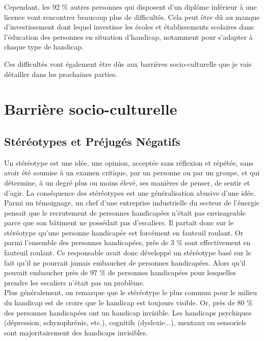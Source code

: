 Cependant, les 92 \% autres personnes qui disposent d'un diplôme inférieur à une licence vont rencontrer beaucoup plus de difficultés. Cela peut être dû au manque d'investissement dont lequel investisse les écoles et établissements scolaires dans l'éducation des personnes en situation d'handicap, notamment pour s'adapter à chaque type de handicap.

Ces difficultés vont également être dûs aux barrières socio-culturelle que je vais détailler dans les prochaines parties.


\section{Barrière socio-culturelle}

\subsection{Stéréotypes et Préjugés Négatifs}
Un stéréotype est une idée, une opinion, acceptée sans réflexion et répétée, sans avoir été soumise à un examen critique, par un personne ou par un groupe, et qui détermine, à un degré plus ou moins élevé, ses manières de penser, de sentir et d'agir.
La conséquence des stéréotypes est une généralisation abusive d'une idée. 
Parmi un témoignage, un chef d'une entreprise industrielle du secteur de l'énergie pensait que le recrutement de personnes handicapées n'était pas envisageable parce que son bâtiment ne possédait pas d'escaliers. Il partait donc sur le stéréotype qu'une personne handicapée est forcément en fauteuil roulant. Or parmi l'ensemble des personnes handicapées, près de 3 \% sont effectivement en fauteuil roulant. Ce responsable avait donc développé un stéréotype basé sur le fait qu'il ne pourrait jamais embaucher de personnes handicapées. Alors qu'il pouvait embaucher près de 97 \% de personnes handicapées pour lesquelles prendre les escaliers n'était pas un problème.\\

Plus généralement, on remarque que le stéréotype le plus commun pour le milieu du handicap est de croire que le handicap est toujours visible. Or, près de 80 \% des personnes handicapées ont un handicap invisible. Les handicaps psychiques (dépression, schyzophrénie, etc.), cognitifs (dyslexie...), mentaux ou sensoriels sont majoritairement des handicaps invisibles.\\

